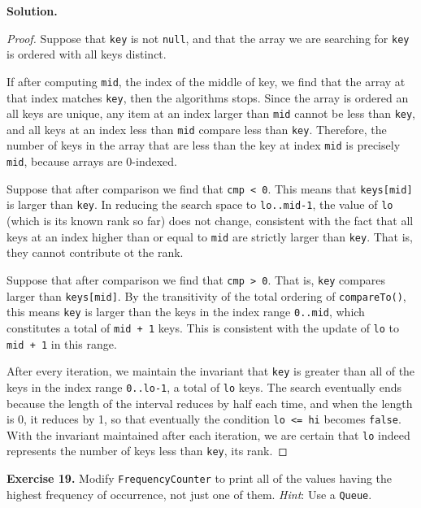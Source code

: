\documentclass[12pt, a4paper]{article}
\newenvironment{ex}[2][Exercise]
{\par\medskip\noindent \textbf{#1 #2.}}
{\medskip}
\newenvironment{sol}[1][Solution]
{\par\medskip\noindent \textbf{#1.} }
{\medskip}
\begin{document}
	\begin{sol}
		\begin{proof}
			Suppose that \texttt{key} is not \texttt{null}, and that the array we are
			searching for \texttt{key} is ordered with all keys distinct.
			
			If after computing \texttt{mid}, the index of the middle of key, we find that the array
			at that index matches \texttt{key}, then the algorithms stops. Since the array
			is ordered an all keys are unique, any item at an index larger than \texttt{mid}
			cannot be less than \texttt{key}, and all keys at an index less than
			\texttt{mid} compare less than \texttt{key}. Therefore, the number of keys in the
			array that are less than the key at index \texttt{mid} is precisely \texttt{mid},
			because arrays are 0-indexed.
			
			Suppose that after comparison we find that \texttt{cmp < 0}. This means that
			\texttt{keys[mid]} is larger than \texttt{key}. In reducing the search space to \texttt{lo..mid-1}, the value of \texttt{lo} (which is its known rank so far) does not change, consistent with the fact that all keys at an index higher than or equal
			to \texttt{mid} are strictly larger than \texttt{key}. That is, they cannot contribute
			ot the rank.
			
			Suppose that after comparison we find that \texttt{cmp > 0}. That is,
			\texttt{key} compares larger than \texttt{keys[mid]}. By the transitivity
			of the total ordering of \texttt{compareTo()}, this means \texttt{key}
			is larger than the keys in the index range \texttt{0..mid}, which constitutes
			a total of \texttt{mid + 1} keys. This is consistent with the update of \texttt{lo}
			to \texttt{mid + 1} in this range.
			
			After every iteration, we maintain the invariant that \texttt{key} is greater
			than all of the keys in the index range \texttt{0..lo-1}, a total of \texttt{lo}
			keys. The search eventually ends because the length of the interval reduces by
			half each time, and when the length is 0, it reduces by 1, so that eventually
			the condition \texttt{lo <= hi} becomes \texttt{false}. With the invariant
			maintained after each iteration, we are certain that \texttt{lo} indeed represents
			the number of keys less than \texttt{key}, its rank.
		\end{proof}
	\end{sol}
	\begin{ex}{19}
		Modify \texttt{FrequencyCounter} to print all of the values having the highest frequency
		of occurrence, not just one of them. \emph{Hint}: Use a \texttt{Queue}.
	\end{ex}
\end{document}
